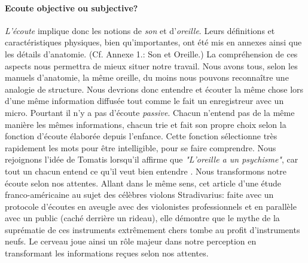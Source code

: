 





\paragraph{Ecoute objective ou subjective?}

\emph{L'écoute} implique donc les notions de \emph{son} et
d'\emph{oreille}. Leurs définitions et caractéristiques physiques, bien qu'importantes, ont été mis en
annexes ainsi que les détails
d'anatomie. (Cf. Annexe 1.: Son et Oreille.)
La compréhension de ces aspects nous
permettra de mieux situer notre travail.
Nous avons tous,
selon les manuels d'anatomie, la même
oreille, du moins nous pouvons reconnaître une analogie de structure. Nous devrions donc entendre et écouter la même chose
lors d'une même information diffusée tout comme le fait un enregistreur avec un micro. Pourtant il n'y a pas d'écoute \emph{passive}. Chacun n'entend pas de la même manière les mêmes
informations, chacun trie et fait son propre choix selon la fonction
d'écoute élaborée depuis l'enfance. Cette fonction sélectionne très
rapidement les mots pour être intelligible, pour se faire
comprendre. Nous rejoignons l'idée de Tomatis lorsqu'il affirme que
\textit{"L'oreille a un psychisme"}, car tout un chacun entend ce qu'il veut bien
entendre \autocite [167]{tomatis_oreille_1987}.
Nous transformons notre écoute selon nos attentes.
Allant dans le même sens, cet
article d'une
étude franco-américaine \autocite{lemonde.fr:stradivarius} au sujet des célèbres violons
Stradivarius: faite avec un protocole
d'écoutes en aveugle avec
des violonistes professionnels et en parallèle avec un public (caché
derrière un rideau), elle démontre que le mythe de la suprématie
de ces instruments extrêmement chers tombe au profit d'instruments
neufs. Le cerveau  joue ainsi un
rôle majeur dans notre perception en 
transformant les informations reçues selon nos attentes.
%
